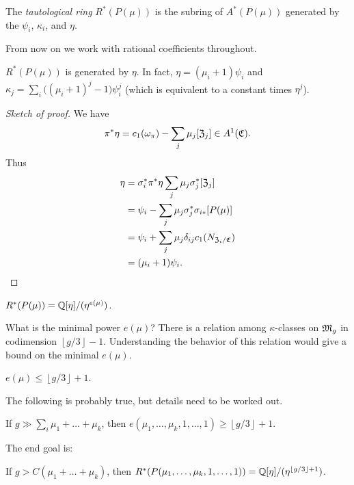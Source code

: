 \documentclass{article}
\begin{document}
\begin{dfn}
	The \emph{tautological ring} $R^*(P(\mu))$ is the subring of $A^*(P(\mu))$ generated by the $\psi_i$, $\kappa_i$, and $\eta$.
\end{dfn}

From now on we work with rational coefficients throughout.

\begin{prop}[Chen]
	$R^*(P(\mu))$ is generated by $\eta$.
	In fact, $\eta = (\mu_i + 1) \psi_i$ and $\kappa_j = \sum_i \big((\mu_i + 1)^j - 1\big) \psi_i^j$ (which is equivalent to a constant times $\eta^j$).
\end{prop}

\begin{proof}[Sketch of proof]
	We have 
	\[
		\pi^* \eta = c_1(\omega_\pi) - \sum_j \mu_j [\mathfrak{Z}_j] \in A^1(\mathfrak{C}).
	\]
	Thus
	\begin{align*}
		\eta &= \sigma_i^* \pi^* \eta \sum_j \mu_j \sigma_j^* [\mathfrak{Z}_j] \\
		     &= \psi_i - \sum_j \mu_j \sigma_j^* \sigma_{i*} [P(\mu)] \\
		     &= \psi_i + \sum_j \mu_j \delta_{ij} c_1(N_{\mathfrak{Z}_i / \mathfrak{C}}) \\
		     &= (\mu_i + 1) \psi_i.
	\end{align*}
\end{proof}

\begin{cor}
	$R^*(P(\mu)) = \mathbb{Q}[\eta] / (\eta^{e(\mu)})$.
\end{cor}

What is the minimal power $e(\mu)$?
There is a relation among $\kappa$-classes on $\mathfrak{M}_g$ in codimension $\left\lfloor g / 3 \right\rfloor - 1$.
Understanding the behavior of this relation would give a bound on the minimal $e(\mu)$.

\begin{conj}
	$e(\mu) \leq \left\lfloor g/3 \right\rfloor + 1$.
\end{conj}

The following is probably true, but details need to be worked out.

\begin{thm}[Chen-L]
	If $g \gg \sum_i \mu_1 + \dots + \mu_k$, then $e(\mu_1, \dots, \mu_k, 1, \dots, 1) \geq \left\lfloor g/3 \right\rfloor + 1$.
\end{thm}

The end goal is:

\begin{conj}
	If $g > C (\mu_1 + \dots + \mu_k)$, then $R^*(P(\mu_1, \dots, \mu_k, 1, \dots, 1)) = \mathbb{Q}[\eta] / (\eta^{\left\lfloor g/3 \right\rfloor + 1})$.
\end{conj}
\end{document}
